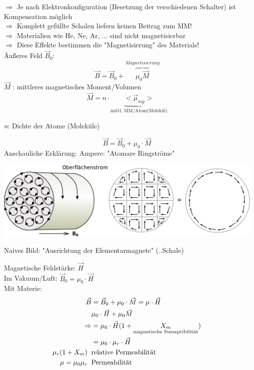 $ \Rightarrow $ Je nach Elektronkonfiguration (Besetzung der verschiedenen Schalter) ist Kompensation möglich \\
$ \Rightarrow $ Komplett gefüllte Schalen liefern keinen Beitrag zum MM! \\
$ \Rightarrow $ Materialien wie He, Ne, Ar, ... sind nicht magnetisierbar \\
$ \Rightarrow $ Diese Effekte bestimmen die "Magnetisierung" des Materials! \\ \break
Äußeres Feld $ \vec{B}_0 $:
$$ \vec{B} = \vec{B}_0 + \overbrace{\mu_0 \vec{M}}^{Magnetisierung} $$
$ \vec{M} $ : mittleres magnetisches Moment/Volumen
$$ \vec{M} = n\cdot \underbrace{<\vec{\mu}_{mg}>}_{\text{mittl. MM/Atom(Molekül)}} $$ \begin{flushright}
	\emph{n}: Dichte der Atome (Moleküle)
\end{flushright}
$$ \boxed{\vec{B} = \vec{B}_0 + \mu_0 \cdot \vec{M}} $$
Anschauliche Erklärung: Ampere: "Atomare Ringströme"
\begin{center}
	\includegraphics[width=0.7\linewidth]{skizzen/17/17B02}
\end{center}
Naives Bild: "Ausrichtung der Elementarmagnete" (..Schale)\\ \break

\noindent Magnetische Feldstärke: $ \vec{H} $ \\
Im Vakuum/Luft: $ \vec{B}_0 = \mu_0 \cdot \vec{H} $\\
Mit Materie: 
\begin{align*}
\vec{B} &= \vec{B}_0 + \mu_0 \cdot \vec{M} = \mu \cdot \vec{H} \\
&\mu_0 \cdot \vec{H} + \mu_0 \vec{M} \\
\Rightarrow &= \mu_0 \cdot \vec{H} (1+\underset{\text{magnetische Suszeptibilität}}{X_m})\\
&=\mu_0 \cdot \mu_r \cdot \vec{H}\\
\mu_r(1+X_m) \hspace{2mm}&\text{relative Permeabilität}\\
\mu = \mu_0\mu_r \hspace{2mm} &\text{Permeabilität}
\end{align*}

